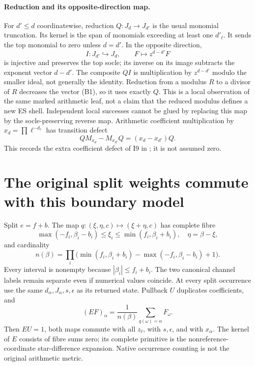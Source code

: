 \paragraph{Reduction and its opposite-direction map.}
For $d'\le d$ coordinatewise, reduction $Q:J_d\to J_{d'}$ is the usual
monomial truncation. Its kernel is the span of monomials exceeding at least
one $d'_\ell$. It sends the top monomial to zero unless $d=d'$.
In the opposite direction,
\[
 I:J_{d'}\hookrightarrow J_d,\qquad F\mapsto z^{d-d'}F
 \tag{B5}
\]
is injective and preserves the top socle; its inverse on its image subtracts
the exponent vector $d-d'$. The composite $QI$ is multiplication by
$z^{d-d'}$ modulo the smaller ideal, not generally the identity.
Reduction from a modulus $R$ to a divisor of $R$ decreases the vector (B1),
so it uses exactly $Q$. This is a local observation of the same marked
arithmetic leaf, not a claim that the reduced modulus defines a new ES shell.
Independent local successes cannot be glued by
replacing this map by the socle-preserving reverse map. Arithmetic coefficient
multiplication by $x_d=\prod\ell^{-d_\ell}$ has transition defect
\[
 Q M_{x_d}-M_{x_{d'}}Q=(x_d-x_{d'})Q.
 \tag{B6}
\]
This records the extra coefficient defect of I9 in \cite{SZ28}; it is not
assumed zero.

\section{The original split weights commute with this boundary model}
Split $e=f+b$. The map $q:(\xi,\eta,c)\mapsto(\xi+\eta,c)$ has complete fibre
\[
 \max(-f_i,\beta_i-b_i)\le\xi_i\le\min(f_i,\beta_i+b_i),\quad
 \eta=\beta-\xi,
\]
and cardinality
\[
 n(\beta)=\prod_i\bigl(\min(f_i,\beta_i+b_i)-\max(-f_i,\beta_i-b_i)+1\bigr).
 \tag{W1}
\]
Every interval is nonempty because $|\beta_i|\le f_i+b_i$.
The two canonical channel labels remain separate even if numerical values
coincide. At every split occurrence use the same $d_\alpha,J_\alpha,s,\epsilon$
as its returned state. Pullback $U$ duplicates coefficients, and
\[
 (EF)_\alpha=\frac1{n(\beta)}\sum_{q(\omega)=\alpha}F_\omega.
 \tag{W2}
\]
Then $EU=1$, both maps commute with all $z_\ell$, with $s,\epsilon$, and with
$x_\alpha$. The kernel of $E$ consists of fibre sums zero; its complete
primitive is the nonreference-coordinate star-difference expansion. Native
occurrence counting is not the original arithmetic metric.

